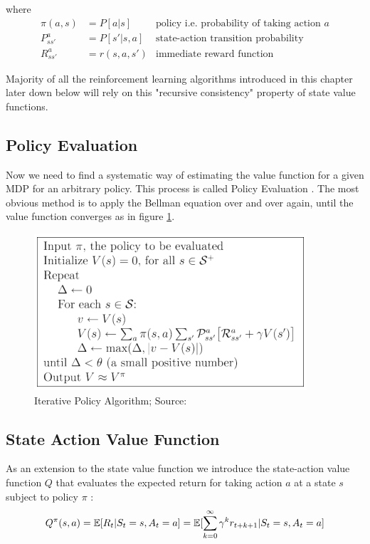 where 
\begin{align*}
    \pi(a, s) &= P[a|s] &\text{policy i.e. probability of taking action $a$}\\
    P^{a}_{ss'} &= P[s' | s, a] &\text{state-action transition probability}\\
    R^{a}_{ss'} &= r(s, a, s') &\text{immediate reward function}
\end{align*}

Majority of all the reinforcement learning algorithms introduced in this chapter later down below will rely on this "recursive consistency" \cite{lecture_mdp} property of state value functions. 
\subsection{Policy Evaluation}
Now we need to find a systematic way of estimating the value
function for a given MDP for an arbitrary policy. This process is called Policy Evaluation \cite{lecture_mdp}. The most obvious method is to apply the Bellman equation over and over again, until the value function converges as in figure \ref{fig:ipa}.
\begin{figure}[H]
  \centering
  \includegraphics[scale=0.8]{figures/iterative_policy_evaluation.PNG}
  \caption{Iterative Policy Algorithm; Source: \cite{lecture_mdp}}
  \label{fig:ipa}
\end{figure}
\subsection{State Action Value Function}
As an extension to the state value function we introduce the state-action value function $Q$ that evaluates the expected return for taking action $a$ at a state $s$ subject to policy $\pi$ \cite{lecture_mdp} :
\begin{align}
    Q^{\pi}(s, a) = \operatorname{\mathbb{E}}[R_t | S_t = s, A_t = a] = \operatorname{\mathbb{E}}[\sum^{\infty}_{k=0} \gamma^k r_{t+k+1} | S_t = s, A_t = a]
\end{align}

